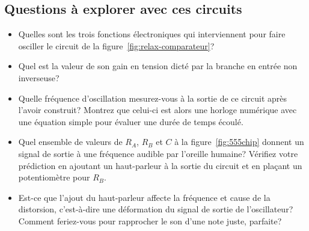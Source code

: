\documentclass[canadien,12pt,oneside,letterpaper]{article}
\begin{document}
\subsection{Questions à explorer avec ces circuits}
\begin{itemize}
    \item Quelles sont les trois fonctions électroniques qui interviennent pour faire osciller le circuit de la figure~\ref{fig:relax-comparateur}? %
    \item Quel est la valeur de son gain en tension dicté par la branche en entrée non inverseuse?
    \item Quelle fréquence d'oscillation mesurez-vous à la sortie de ce circuit après l'avoir construit? Montrez que celui-ci est alors une horloge numérique avec une équation simple pour évaluer une durée de temps écoulé.
    \item Quel ensemble de valeurs de $R_A$, $R_B$ et $C$ à la figure~\ref{fig:555chip} donnent un signal de sortie à une fréquence audible par l'oreille humaine? Vérifiez votre prédiction en ajoutant un haut-parleur à la sortie du circuit et en plaçant un potentiomètre pour $R_B$. %
    \item  Est-ce que l'ajout du haut-parleur affecte la fréquence et cause de la distorsion, c'est-à-dire une déformation du signal de sortie de l'oscillateur? Comment feriez-vous pour rapprocher le son d'une note juste, parfaite? %
\end{itemize}
\end{document}

